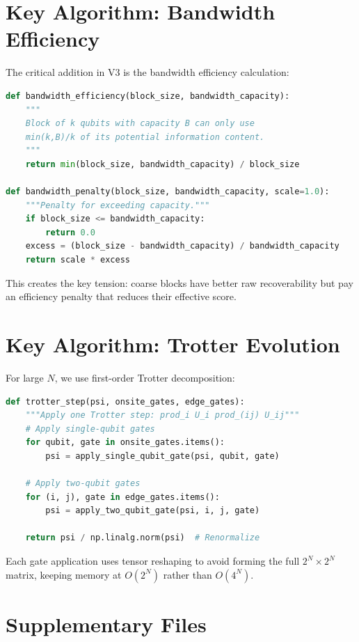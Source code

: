\documentclass[11pt]{article}
\begin{document}
\section{Key Algorithm: Bandwidth Efficiency}

The critical addition in V3 is the bandwidth efficiency calculation:

\begin{lstlisting}[language=Python]
def bandwidth_efficiency(block_size, bandwidth_capacity):
    """
    Block of k qubits with capacity B can only use 
    min(k,B)/k of its potential information content.
    """
    return min(block_size, bandwidth_capacity) / block_size

def bandwidth_penalty(block_size, bandwidth_capacity, scale=1.0):
    """Penalty for exceeding capacity."""
    if block_size <= bandwidth_capacity:
        return 0.0
    excess = (block_size - bandwidth_capacity) / bandwidth_capacity
    return scale * excess
\end{lstlisting}

This creates the key tension: coarse blocks have better raw recoverability but 
pay an efficiency penalty that reduces their effective score.

\section{Key Algorithm: Trotter Evolution}

For large $N$, we use first-order Trotter decomposition:

\begin{lstlisting}[language=Python]
def trotter_step(psi, onsite_gates, edge_gates):
    """Apply one Trotter step: prod_i U_i prod_(ij) U_ij"""
    # Apply single-qubit gates
    for qubit, gate in onsite_gates.items():
        psi = apply_single_qubit_gate(psi, qubit, gate)
    
    # Apply two-qubit gates  
    for (i, j), gate in edge_gates.items():
        psi = apply_two_qubit_gate(psi, i, j, gate)
    
    return psi / np.linalg.norm(psi)  # Renormalize
\end{lstlisting}

Each gate application uses tensor reshaping to avoid forming the full $2^N \times 2^N$ 
matrix, keeping memory at $O(2^N)$ rather than $O(4^N)$.

\section{Supplementary Files}
\end{document}
